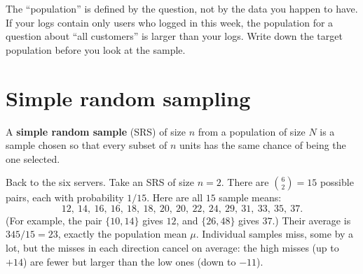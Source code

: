 \begin{trapbox}
The ``population'' is defined by the question, not by the data you happen to have. If
your logs contain only users who logged in this week, the population for a question
about ``all customers'' is larger than your logs. Write down the target population
before you look at the sample.
\end{trapbox}

\section{Simple random sampling}
\label{sec:sampling-srs}

\begin{definition}
A \textbf{simple random sample} (SRS) of size $n$ from a population of size $N$ is a
sample chosen so that every subset of $n$ units has the same chance of being the one
selected.
\end{definition}

Back to the six servers. Take an SRS of size $n=2$. There are $\binom{6}{2}=15$ possible
pairs, each with probability $1/15$. Here are all $15$ sample means:
\[
  12,\ 14,\ 16,\ 16,\ 18,\ 18,\ 20,\ 20,\ 22,\ 24,\ 29,\ 31,\ 33,\ 35,\ 37 .
\]
(For example, the pair $\{10,14\}$ gives $12$, and $\{26,48\}$ gives $37$.) Their average
is $345/15 = 23$, exactly the population mean $\mu$. Individual samples miss, some by a
lot, but the misses in each direction cancel on average: the high misses (up to $+14$)
are fewer but larger than the low ones (down to $-11$).

